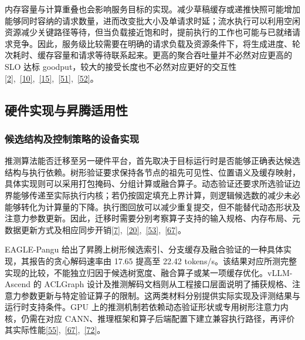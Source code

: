 \documentclass[11pt,a4paper,UTF8,fontset=none,scheme=plain,zihao=-4]{ctexart}
\begin{document}
内存容量与计算重叠也会影响服务目标的实现。减少草稿缓存或递推快照可能增加能够同时容纳的请求数量，进而改变批大小及单请求时延；流水执行可以利用空闲资源减少关键路径等待，但当负载接近饱和时，提前执行的工作也可能与已就绪请求竞争。因此，服务级比较需要在明确的请求负载及资源条件下，将生成进度、轮次耗时、缓存容量和请求等待联系起来。更高的聚合吞吐量并不必然对应更高的
SLO 达标
goodput，较大的接受长度也不必然对应更好的交互性\protect\hyperlink{ref-magicdec}{{[}2{]}},~\protect\hyperlink{ref-smartspec}{{[}10{]}},~\protect\hyperlink{ref-replayssm}{{[}15{]}},~\protect\hyperlink{ref-ssd}{{[}51{]}},~\protect\hyperlink{ref-callo}{{[}52{]}}。

\hypertarget{section-7-4}{%
\subsection{硬件实现与昇腾适用性}\label{section-7-4}}

\hypertarget{section-7-4-1}{%
\subsubsection{候选结构及控制策略的设备实现}\label{section-7-4-1}}

推测算法能否迁移至另一硬件平台，首先取决于目标运行时是否能够正确表达候选结构与执行依赖。树形验证要求保持各节点的祖先可见性、位置语义及缓存映射，具体实现则可以采用打包掩码、分组计算或融合算子。动态验证还要求所选验证边界能够传递至实际执行内核；若仍按固定填充上界计算，则逻辑候选数的减少未必能够转化为计算量的下降。执行图回放可以减少重复提交，但不能替代动态形状及注意力参数更新。因此，迁移时需要分别考察算子支持的输入规格、内存布局、元数据更新方式及相应同步开销\protect\hyperlink{ref-specinfer}{{[}7{]}},~\protect\hyperlink{ref-vllmgraphdocs}{{[}20{]}},~\protect\hyperlink{ref-avdocs}{{[}53{]}},~\protect\hyperlink{ref-eaglepangu}{{[}67{]}}。

EAGLE-Pangu
给出了昇腾上树形候选索引、分支缓存及融合验证的一种具体实现，其报告的贪心解码速率由
17.65 提高至 22.42
tokens/s。该结果对应所测完整实现的比较，不能独立归因于候选树宽度、融合算子或某一项缓存优化。vLLM-Ascend
的 ACLGraph
设计及推测解码文档则从工程接口层面说明了捕获规格、注意力参数更新与特定验证算子的限制。这两类材料分别提供实际实现及评测结果与运行时支持条件。GPU
上的推测机制若依赖动态验证形状或专用树形注意力内核，仍需在对应
CANN、推理框架和算子后端配置下建立兼容执行路径，再评价其实际性能\protect\hyperlink{ref-ascendgraphdocs}{{[}55{]}},~\protect\hyperlink{ref-eaglepangu}{{[}67{]}},~\protect\hyperlink{ref-ascenddocs}{{[}72{]}}。
\end{document}
